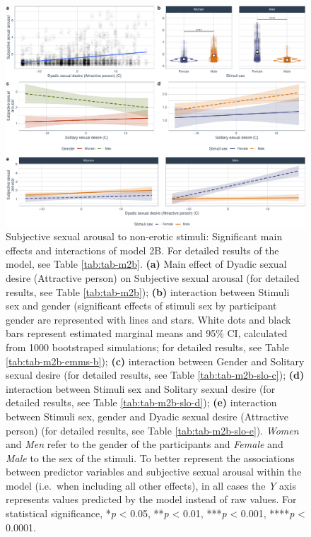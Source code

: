 \documentclass[
  bookmarksnumbered]{article}
\begin{document}
\begin{figure}
\centering
\includegraphics{Deseo_excitacion_sexual_files/figure-latex/fig-h2b-1.pdf}
\caption{\label{fig:fig-h2b}Subjective sexual arousal to non-erotic stimuli: Significant main effects and interactions of model 2B. For detailed results of the model, see Table \ref{tab:tab-m2b}. \textbf{(a)} Main effect of Dyadic sexual desire (Attractive person) on Subjective sexual arousal (for detailed results, see Table \ref{tab:tab-m2b}); \textbf{(b)} interaction between Stimuli sex and gender (significant effects of stimuli sex by participant gender are represented with lines and stars. White dots and black bars represent estimated marginal means and 95\% CI, calculated from 1000 bootstraped simulations; for detailed results, see Table \ref{tab:tab-m2b-emms-b}); \textbf{(c)} interaction between Gender and Solitary sexual desire (for detailed results, see Table \ref{tab:tab-m2b-slo-c}); \textbf{(d)} interaction between Stimuli sex and Solitary sexual desire (for detailed results, see Table \ref{tab:tab-m2b-slo-d}); \textbf{(e)} interaction between Stimuli sex, gender and Dyadic sexual desire (Attractive person) (for detailed results, see Table \ref{tab:tab-m2b-slo-e}). \emph{Women} and \emph{Men} refer to the gender of the participants and \emph{Female} and \emph{Male} to the sex of the stimuli. To better represent the associations between predictor variables and subjective sexual arousal within the model (i.e.~when including all other effects), in all cases the \emph{Y} axis represents values predicted by the model instead of raw values. For statistical significance, *\emph{p} \textless{} 0.05, **\emph{p} \textless{} 0.01, ***\emph{p} \textless{} 0.001, ****\emph{p} \textless{} 0.0001.}
\end{figure}
\end{document}
